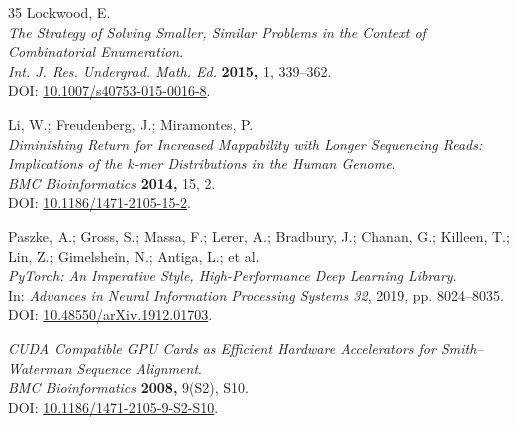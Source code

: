 \documentclass{article}
\theoremstyle{remark}
\begin{document}
\begin{thebibliography}{35}
Lockwood, E.\\
\textit{The Strategy of Solving Smaller, Similar Problems in the Context of Combinatorial Enumeration}.\\
\textit{Int. J. Res. Undergrad. Math. Ed.} \textbf{2015,} 1, 339--362.\\
DOI: \href{https://doi.org/10.1007/s40753-015-0016-8}{10.1007/s40753-015-0016-8}.

Li, W.; Freudenberg, J.; Miramontes, P.\\
\textit{Diminishing Return for Increased Mappability with Longer Sequencing Reads: Implications of the k-mer Distributions in the Human Genome}.\\
\textit{BMC Bioinformatics} \textbf{2014,} 15, 2.\\
DOI: \href{https://doi.org/10.1186/1471-2105-15-2}{10.1186/1471-2105-15-2}.

Paszke, A.; Gross, S.; Massa, F.; Lerer, A.; Bradbury, J.; Chanan, G.; Killeen, T.; Lin, Z.; Gimelshein, N.; Antiga, L.; et al.\\
\textit{PyTorch: An Imperative Style, High-Performance Deep Learning Library}.\\
In: \textit{Advances in Neural Information Processing Systems 32}, 2019, pp. 8024--8035.\\
DOI: \href{https://doi.org/10.48550/arXiv.1912.01703}{10.48550/arXiv.1912.01703}.

\textit{CUDA Compatible GPU Cards as Efficient Hardware Accelerators for Smith--Waterman Sequence Alignment}.\\
\textit{BMC Bioinformatics} \textbf{2008,} 9(S2), S10.\\
DOI: \href{https://doi.org/10.1186/1471-2105-9-S2-S10}{10.1186/1471-2105-9-S2-S10}.

\end{thebibliography}
\end{document}
